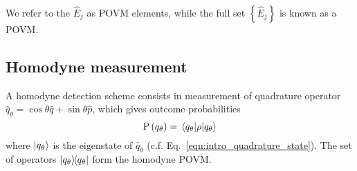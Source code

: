 \noindent We refer to the $\hat{E}_j$ as POVM elements, while the full set $\left\{\hat{E}_j\right\}$ is known as a POVM.



\FloatBarrier
\subsection{Homodyne measurement}\label{sec:intro_homodyne}
A homodyne detection scheme consists in measurement of quadrature operator $\hat{q}_\theta = \cos\theta \hat{q} + \sin\theta \hat{p}$, which gives outcome probabilities
\begin{equation}
\text{P}\left(q_\theta\right) = \ev{\rho}{q_\theta}
\end{equation}
where $\ket{q_\theta}$ is the eigenstate of $\hat{q}_\theta$ (c.f. Eq.~\ref{eqn:intro_quadrature_state}).%
The set of operators $\dyad{q_\theta}$ form the homodyne POVM.


